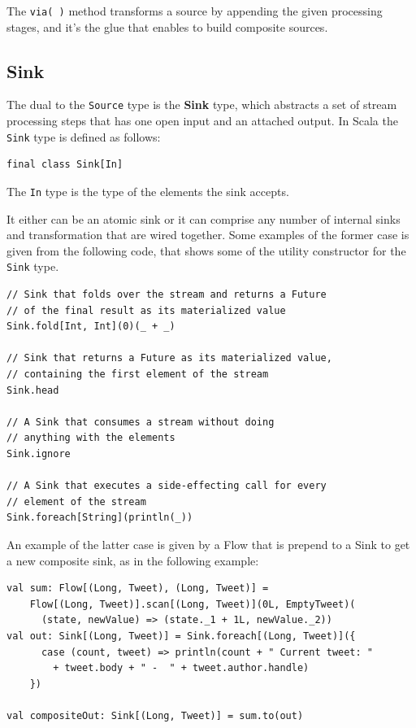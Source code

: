 The \texttt{via(\ )} method transforms a source by appending the given
processing stages, and it's the glue that enables to build composite
sources.


\subsection{Sink}\label{sink}

The dual to the \texttt{Source} type is the \textbf{Sink} type, which
abstracts a set of stream processing steps that has one open input and
an attached output. In Scala the \texttt{Sink} type is defined as
follows:

\begin{verbatim}
final class Sink[In]
\end{verbatim}

The \texttt{In} type is the type of the elements the sink accepts.

It either can be an atomic sink or it can comprise any number of
internal sinks and transformation that are wired together. Some examples
of the former case is given from the following code, that shows some of
the utility constructor for the \texttt{Sink} type.

\begin{verbatim}
// Sink that folds over the stream and returns a Future
// of the final result as its materialized value
Sink.fold[Int, Int](0)(_ + _)

// Sink that returns a Future as its materialized value,
// containing the first element of the stream
Sink.head

// A Sink that consumes a stream without doing 
// anything with the elements
Sink.ignore

// A Sink that executes a side-effecting call for every 
// element of the stream
Sink.foreach[String](println(_))
\end{verbatim}

An example of the latter case is given by a Flow that is prepend to a
Sink to get a new composite sink, as in the following example:

\begin{verbatim}
val sum: Flow[(Long, Tweet), (Long, Tweet)] = 
	Flow[(Long, Tweet)].scan[(Long, Tweet)](0L, EmptyTweet)(
      (state, newValue) => (state._1 + 1L, newValue._2))
val out: Sink[(Long, Tweet)] = Sink.foreach[(Long, Tweet)]({
      case (count, tweet) => println(count + " Current tweet: " 
      	+ tweet.body + " -  " + tweet.author.handle)
    })

val compositeOut: Sink[(Long, Tweet)] = sum.to(out)
\end{verbatim}


